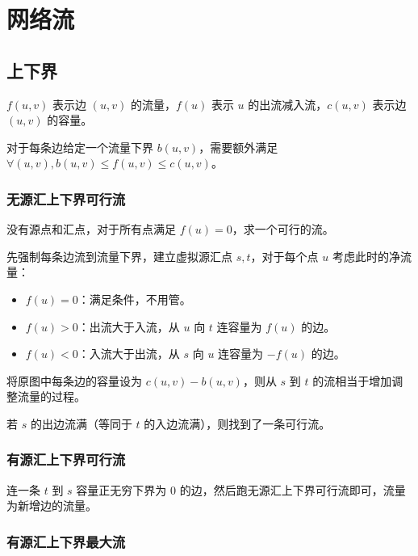 \section{网络流}

\subsection{上下界}

\begin{tcolorbox}
$f(u, v)$ 表示边 $(u, v)$ 的流量，$f(u)$ 表示 $u$ 的出流减入流，$c(u, v)$ 表示边 $(u, v)$ 的容量。

对于每条边给定一个流量下界 $b(u, v)$，需要额外满足 $\forall (u, v), b(u, v) \le f(u, v) \le c(u, v)$。
\end{tcolorbox}

\subsubsection{无源汇上下界可行流}

没有源点和汇点，对于所有点满足 $f(u) = 0$，求一个可行的流。

先强制每条边流到流量下界，建立虚拟源汇点 $s, t$，对于每个点 $u$ 考虑此时的净流量：

\begin{itemize}
    \item $f(u) = 0$：满足条件，不用管。
    \item $f(u) > 0$：出流大于入流，从 $u$ 向 $t$ 连容量为 $f(u)$ 的边。
    \item $f(u) < 0$：入流大于出流，从 $s$ 向 $u$ 连容量为 $-f(u)$ 的边。
\end{itemize}

将原图中每条边的容量设为 $c(u, v) - b(u, v)$，则从 $s$ 到 $t$ 的流相当于增加调整流量的过程。

若 $s$ 的出边流满（等同于 $t$ 的入边流满），则找到了一条可行流。

\subsubsection{有源汇上下界可行流}

连一条 $t$ 到 $s$ 容量正无穷下界为 $0$ 的边，然后跑无源汇上下界可行流即可，流量为新增边的流量。

\subsubsection{有源汇上下界最大流}

